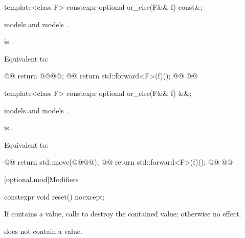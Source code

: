 %
\begin{itemdecl}
template<class F>
  constexpr optional or_else(F&& f) const&;
\end{itemdecl}

\begin{itemdescr}
\pnum
\constraints
{} models  and  models .

\pnum
\mandates
{} is .

\pnum
\effects
Equivalent to:
\begin{codeblock}
@@
  return @@@@;
@@
  return std::forward<F>(f)();
@\removed{\}}@
@@

\end{codeblock}
\end{itemdescr}

%
\begin{itemdecl}
template<class F>
  constexpr optional or_else(F&& f) &&;
\end{itemdecl}

\begin{itemdescr}
\pnum
\constraints
{} models  and  models .

\pnum
\mandates
{} is .

\pnum
\effects
Equivalent to:
\begin{codeblock}
@@
  return std::move(@@@@);
@@
  return std::forward<F>(f)();
@\removed{\}}@
@@

\end{codeblock}
\end{itemdescr}

[optional.mod]{Modifiers}

%
\begin{itemdecl}
constexpr void reset() noexcept;
\end{itemdecl}

\begin{itemdescr}
\pnum
\effects
If  contains a value, calls  to destroy the contained value; otherwise no effect.

\pnum
\ensures
{} does not contain a value.
\end{itemdescr}

